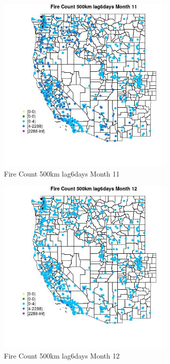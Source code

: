 \begin{figure} 
\centering  
\includegraphics[width=0.77\textwidth]{Code_Outputs/Report_ML_input_PM25_Step4_part_e_de_duplicated_aves_compiled_2019-05-21wNAs_MapObsMo11Fire_Count_500km_lag6days.jpg} 
\caption{\label{fig:Report_ML_input_PM25_Step4_part_e_de_duplicated_aves_compiled_2019-05-21wNAsMapObsMo11Fire_Count_500km_lag6days}Fire Count 500km lag6days Month 11} 
\end{figure} 
 

\begin{figure} 
\centering  
\includegraphics[width=0.77\textwidth]{Code_Outputs/Report_ML_input_PM25_Step4_part_e_de_duplicated_aves_compiled_2019-05-21wNAs_MapObsMo12Fire_Count_500km_lag6days.jpg} 
\caption{\label{fig:Report_ML_input_PM25_Step4_part_e_de_duplicated_aves_compiled_2019-05-21wNAsMapObsMo12Fire_Count_500km_lag6days}Fire Count 500km lag6days Month 12} 
\end{figure} 
 

